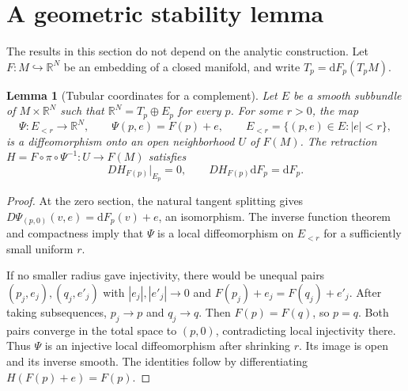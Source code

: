 \documentclass[11pt,a4paper]{article}
\newcommand{\R}{\mathbb R}
\newcommand{\dd}{\mathrm d}
\newtheorem{lemma}[theorem]{Lemma}
\theoremstyle{definition}
\theoremstyle{remark}
\numberwithin{equation}{section}
\begin{document}
\section{A geometric stability lemma}
\label{sec:stability}

The results in this section do not depend on the analytic construction.
Let $F:M\hookrightarrow\R^N$ be an embedding of a closed manifold, and
write $T_p=\dd F_p(T_pM)$.

\begin{lemma}[Tubular coordinates for a complement]
\label{lem:tubular}
Let $E$ be a smooth subbundle of $M\times\R^N$ such that
$\R^N=T_p\oplus E_p$ for every $p$. For some $r>0$, the map
\[
 \Psi:E_{<r}\longrightarrow\R^N,\qquad
 \Psi(p,e)=F(p)+e,\qquad E_{<r}=\{(p,e)\in E:|e|<r\},
\]
is a diffeomorphism onto an open neighborhood $U$ of $F(M)$.
The retraction $H=F\circ\pi\circ\Psi^{-1}:U\to F(M)$ satisfies
\begin{equation}
 DH_{F(p)}|_{E_p}=0,\qquad DH_{F(p)}\dd F_p=\dd F_p.
 \label{eq:retraction}
\end{equation}
\end{lemma}
\begin{proof}
At the zero section, the natural tangent splitting gives
$D\Psi_{(p,0)}(v,e)=\dd F_p(v)+e$, an isomorphism. The inverse
function theorem and compactness imply that $\Psi$ is a local
diffeomorphism on $E_{<r}$ for a sufficiently small uniform $r$.

If no smaller radius gave injectivity, there would be unequal pairs
$(p_j,e_j),(q_j,e'_j)$ with $|e_j|,|e'_j|\to0$ and
$F(p_j)+e_j=F(q_j)+e'_j$. After taking subsequences, $p_j\to p$ and
$q_j\to q$. Then $F(p)=F(q)$, so $p=q$. Both pairs converge in the
total space to $(p,0)$, contradicting local injectivity there.
Thus $\Psi$ is an injective local diffeomorphism after shrinking $r$.
Its image is open and its inverse smooth. The identities follow by
differentiating $H(F(p)+e)=F(p)$.
\end{proof}
\end{document}
